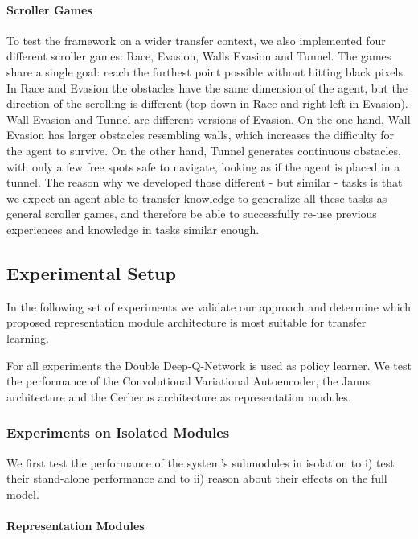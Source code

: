 \paragraph{Scroller Games}
To test the framework on a wider transfer context, we also implemented four different scroller games:
Race, Evasion, Walls Evasion and Tunnel. The games share a single goal: reach the furthest point possible without hitting black pixels. 
In Race and Evasion the obstacles have the same dimension of the agent, but the direction of the scrolling is different (top-down in Race and right-left in Evasion). Wall Evasion and Tunnel are different versions of Evasion. 
On the one hand, Wall Evasion has larger obstacles resembling walls, which increases the difficulty for the agent to survive. 
On the other hand, Tunnel generates continuous obstacles, with only a few free spots safe to navigate, looking as if the agent is placed in a tunnel. 
The reason why we developed those different - but similar - tasks is that we expect an agent able to transfer knowledge to generalize all these tasks as general scroller games, and therefore be able to successfully re-use previous experiences and knowledge in tasks similar enough.

\subsection{Experimental Setup}
In the following set of experiments we validate our approach and determine which proposed representation module architecture is most suitable for transfer learning.

For all experiments the Double Deep-Q-Network is used as policy learner. We test the performance of the Convolutional Variational Autoencoder, the Janus architecture and the Cerberus architecture as representation modules.

\subsubsection{Experiments on Isolated Modules}
We first test the performance of the system's submodules in isolation to i) test their stand-alone performance and to ii) reason about their effects on the full model.

\paragraph{Representation Modules}

